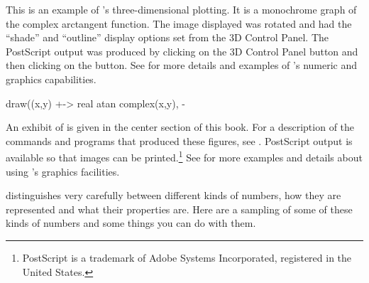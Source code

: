 {{{{{{{{\begin{psXtc}
\begin{xtccomment}
This is an example of \Language{}'s three-dimensional plotting.
It is a monochrome graph of the complex arctangent
function.
The image displayed was rotated and had the ``shade'' and ``outline''
display options set from the 3D Control Panel.
The PostScript output was produced by clicking on the
 3D Control Panel button and then
clicking on the  button.
See  for more details and examples
of \Language{}'s numeric and graphics capabilities.
\end{xtccomment}
\begin{spadsrc}
draw((x,y) +-> real atan complex(x,y), -%
\end{spadsrc}
\end{psXtc}

An exhibit of \Gallery{} is given in the
center section of this book.
For a description of the commands and programs that
produced these figures, see .
PostScript
output is available so that \Language{} images can be
printed.\footnote{PostScript is a trademark of Adobe Systems Incorporated,
registered in the United States.}
See  for more examples and details about using
\Language{}'s graphics facilities.

%

\Language{} distinguishes very carefully between different kinds
of numbers, how they are represented and what their properties
are.
Here are a sampling of some of these kinds of numbers and some
things you can do with them.

}}}}}}}}
